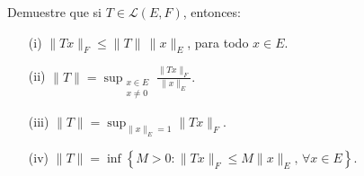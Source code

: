 Demuestre que si $T \in \mathcal{L}(E, F)$, entonces:

\begin{enumerate}
    \item[(i)] $\|T x\|_F \leq \|T\| \, \|x\|_E$, para todo $x \in E$.
    
    \item[(ii)] $
    \|T\| = \sup_{\substack{x \in E \\ x \neq 0}} \frac{\|T x\|_F}{\|x\|_E}.$
    
    
    \item[(iii)] 
    $
    \|T\| = \sup_{\|x\|_E = 1} \|T x\|_F.
    $
    
    \item[(iv)] 
    $
    \|T\| = \inf \left\{ M > 0 : \|T x\|_F \leq M \|x\|_E, \, \forall x \in E \right\}.
    $
\end{enumerate}
